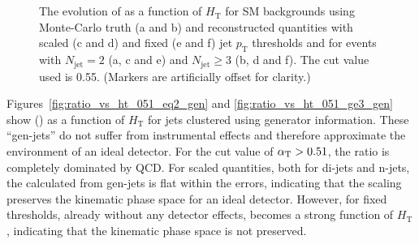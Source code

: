 \begin{figure}[!h]
  \begin{center} 
     \\
     \\
    \caption{\label{fig:ratio_vs_ht_055} The evolution of \RaT as a
      function of $H_{\mathrm{T}}$ for SM backgrounds using
      Monte-Carlo truth (a and b) and reconstructed quantities with
      scaled (c and d) and fixed (e and f) jet $p_{\mathrm{T}}$
      thresholds and for events with $N_{\mathrm{jet}} = 2$ (a, c and
      e) and $N_{\mathrm{jet}} \geq 3$ (b, d and f). The \aT cut value
      used is 0.55. (Markers are artificially offset for clarity.)}
  \end{center}
\end{figure}

Figures~\ref{fig:ratio_vs_ht_051_eq2_gen} and
\ref{fig:ratio_vs_ht_051_ge3_gen} show \raT() as a function of
$H_{\mathrm{T}}$ for jets clustered using generator information. These
``gen-jets'' do not suffer from instrumental effects and therefore
approximate the environment of an ideal detector.  For the cut value
of $\alpha_{\mathrm{T}} > 0.51$, the ratio \RaT is completely dominated by QCD. For
scaled quantities, both for di-jets and n-jets, the \RaT calculated
from gen-jets is flat within the errors, indicating that the scaling
preserves the kinematic phase space for an ideal detector. However,
for fixed thresholds, already without any detector effects, \RaT
becomes a strong function of $H_{\mathrm{T}}$, indicating that the
kinematic phase space is not preserved. 

